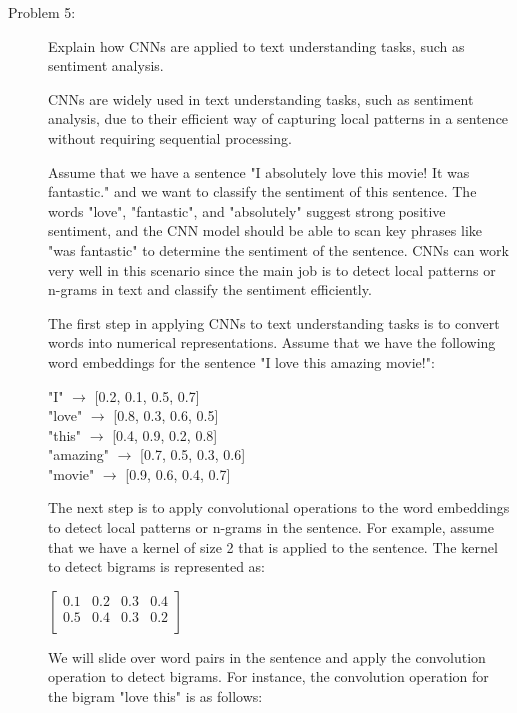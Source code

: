 \documentclass[10pt]{article}
\begin{document}
\begin{description}
\pagebreak

\item[Problem 5:] \hfill Explain how CNNs are applied to text understanding tasks, such as sentiment analysis.

CNNs are widely used in text understanding tasks, such as sentiment analysis, due to their efficient way of capturing local patterns in a sentence without 
requiring sequential processing. 

Assume that we have a sentence "I absolutely love this movie! It was fantastic." and we want to classify the sentiment of this sentence.
The words "love", "fantastic", and "absolutely" suggest strong positive sentiment, and the CNN model should be able to scan key phrases like "was fantastic" to
determine the sentiment of the sentence. CNNs can work very well in this scenario since the main job is to detect local patterns or n-grams in text and classify the 
sentiment efficiently.

The first step in applying CNNs to text understanding tasks is to convert words into numerical representations.
Assume that we have the following word embeddings for the sentence "I love this amazing movie!":

\begin{center}
    "I" $\rightarrow$ [0.2, 0.1, 0.5, 0.7] \\
    "love" $\rightarrow$ [0.8, 0.3, 0.6, 0.5] \\
    "this" $\rightarrow$ [0.4, 0.9, 0.2, 0.8] \\
    "amazing" $\rightarrow$ [0.7, 0.5, 0.3, 0.6] \\
    "movie" $\rightarrow$ [0.9, 0.6, 0.4, 0.7] \\
\end{center}

The next step is to apply convolutional operations to the word embeddings to detect
local patterns or n-grams in the sentence. For example, assume that we have a kernel of size 2 that is applied to the sentence.
The kernel to detect bigrams is represented as:

\begin{center}
    $\displaystyle{\begin{bmatrix} 0.1 & 0.2 & 0.3 & 0.4 \\  0.5 & 0.4 & 0.3 & 0.2 \\ \end{bmatrix}}$
\end{center}

We will slide over word pairs in the sentence and apply the convolution operation to detect bigrams.
For instance, the convolution operation for the bigram "love this" is as follows:


\end{description}
\end{document}
